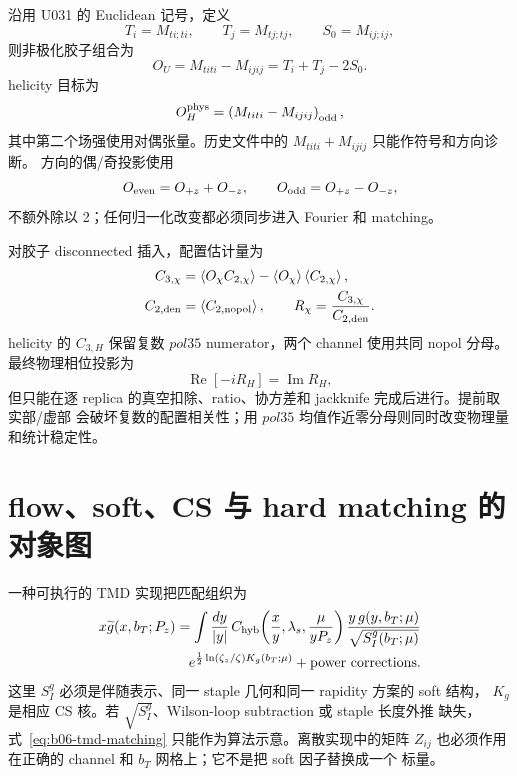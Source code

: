 沿用 U031 的 Euclidean 记号，定义
\begin{equation}
  T_i=M_{ti;ti},\qquad
  T_j=M_{tj;tj},\qquad
  S_0=M_{ij;ij},
  \label{eq:b06-ope-primitives}
\end{equation}
则非极化胶子组合为
\begin{equation}
  O_U=M_{titi}-M_{ijij}
  =T_i+T_j-2S_0 .
  \label{eq:b06-unpolarized-combination}
\end{equation}
helicity 目标为
\begin{equation}
  O_H^{\rm phys}
  =\left(M_{titi}-M_{ijij}\right)_{\rm odd},
  \label{eq:b06-helicity-combination}
\end{equation}
其中第二个场强使用对偶张量。历史文件中的 \(M_{titi}+M_{ijij}\) 只能作符号和方向诊断。
方向的偶/奇投影使用
\begin{equation}
  O_{\rm even}=O_{+z}+O_{-z},
  \qquad
  O_{\rm odd}=O_{+z}-O_{-z},
  \label{eq:b06-even-odd}
\end{equation}
不额外除以 2；任何归一化改变都必须同步进入 Fourier 和 matching。

对胶子 disconnected 插入，配置估计量为
\begin{align}
  C_{3,\chi}
  &=\left\langle O_\chi C_{2,\chi}\right\rangle
  -\left\langle O_\chi\right\rangle
  \left\langle C_{2,\chi}\right\rangle,
  \label{eq:b06-c3-disconnected}\\
  C_{2,\rm den}
  &=\left\langle C_{2,\rm nopol}\right\rangle,
  \qquad
  R_\chi=\frac{C_{3,\chi}}{C_{2,\rm den}}.
  \label{eq:b06-ratio-common-denom}
\end{align}
helicity 的 \(C_{3,H}\) 保留复数 \(pol35\) numerator，两个 channel 使用共同 nopol
分母。最终物理相位投影为
\begin{equation}
  \operatorname{Re}[-iR_H]=\operatorname{Im}R_H,
  \label{eq:b06-helicity-phase}
\end{equation}
但只能在逐 replica 的真空扣除、ratio、协方差和 jackknife 完成后进行。提前取实部/虚部
会破坏复数的配置相关性；用 \(pol35\) 均值作近零分母则同时改变物理量和统计稳定性。

\section{flow、soft、CS 与 hard matching 的对象图}

一种可执行的 TMD 实现把匹配组织为
\begin{equation}
  \begin{aligned}
  x\widetilde g(x,b_T;P_z)
  =\int\frac{dy}{|y|}\,
  C_{\rm hyb}\!\left(\frac{x}{y},\lambda_s,\frac{\mu}{yP_z}\right)
  \frac{y\,g(y,b_T;\mu)}{\sqrt{S_I^g(b_T;\mu)}}\\
  e^{\frac12\ln(\zeta_z/\zeta)K_g(b_T;\mu)}
  +\text{power corrections}.
  \end{aligned}
  \label{eq:b06-tmd-matching}
\end{equation}
这里 \(S_I^g\) 必须是伴随表示、同一 staple 几何和同一 rapidity 方案的 soft 结构，
\(K_g\) 是相应 CS 核。若 \(\sqrt{S_I^g}\)、Wilson-loop subtraction 或 staple 长度外推
缺失，式~\eqref{eq:b06-tmd-matching} 只能作为算法示意。离散实现中的矩阵
\(Z_{ij}\) 也必须作用在正确的 channel 和 \(b_T\) 网格上；它不是把 soft 因子替换成一个
标量。


